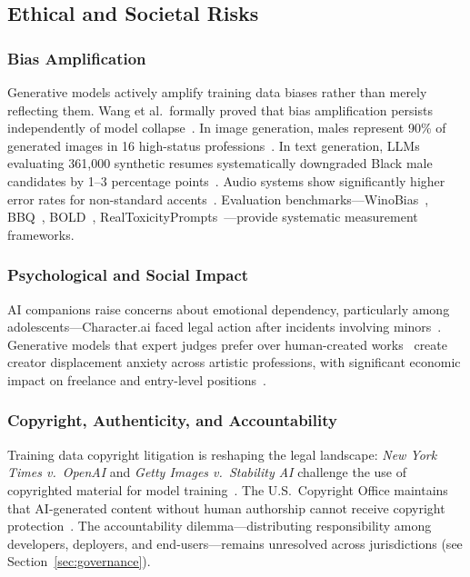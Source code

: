 \subsection{Ethical and Societal Risks}
\label{sec:threat-ethics}

\subsubsection{Bias Amplification}
\label{sec:threat-bias}

Generative models actively amplify training data biases rather than merely reflecting them. Wang et al.\ formally proved that bias amplification persists independently of model collapse~\cite{wang2024biasamplification}. In image generation, males represent 90\% of generated images in 16 high-status professions~\cite{sdxl2024bias}. In text generation, LLMs evaluating 361,000 synthetic resumes systematically downgraded Black male candidates by 1--3 percentage points~\cite{pnas2024llmbias}. Audio systems show significantly higher error rates for non-standard accents~\cite{michel2025accentbias}. Evaluation benchmarks---WinoBias~\cite{zhao2018winobias}, BBQ~\cite{parrish2022bbq}, BOLD~\cite{dhamala2021bold}, RealToxicityPrompts~\cite{gehman2020toxicity}---provide systematic measurement frameworks.


\subsubsection{Psychological and Social Impact}
\label{sec:threat-psych}

AI companions raise concerns about emotional dependency, particularly among adolescents---Character.ai faced legal action after incidents involving minors~\cite{characterai2024}. Generative models that expert judges prefer over human-created works~\cite{chi2026creative} create creator displacement anxiety across artistic professions, with significant economic impact on freelance and entry-level positions~\cite{aisafetyreport2026}.


\subsubsection{Copyright, Authenticity, and Accountability}
\label{sec:threat-copyright}

Training data copyright litigation is reshaping the legal landscape: \emph{New York Times v.\ OpenAI} and \emph{Getty Images v.\ Stability AI} challenge the use of copyrighted material for model training~\cite{nytvopenai2023,gettyvstability2023}. The U.S.\ Copyright Office maintains that AI-generated content without human authorship cannot receive copyright protection~\cite{usco2023}. The accountability dilemma---distributing responsibility among developers, deployers, and end-users---remains unresolved across jurisdictions (see Section~\ref{sec:governance}).


